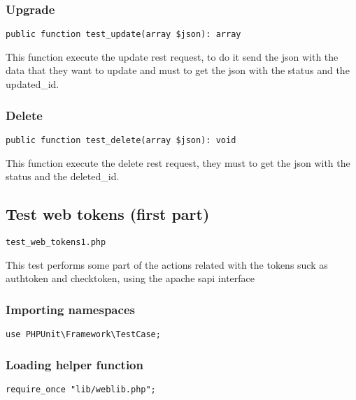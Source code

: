 \documentclass[a4paper]{article}
\begin{document}
\hypertarget{toc75}{}
\subsubsection{Upgrade}

\begin{lstlisting}
public function test_update(array $json): array
\end{lstlisting}

This function execute the update rest request, to do it send the json with
the data that they want to update and must to get the json with the status
and the updated\_id.

\hypertarget{toc76}{}
\subsubsection{Delete}

\begin{lstlisting}
public function test_delete(array $json): void
\end{lstlisting}

This function execute the delete rest request, they must to get the json
with the status and the deleted\_id.

\hypertarget{toc77}{}
\subsection{Test web tokens (first part)}

\begin{lstlisting}
test_web_tokens1.php
\end{lstlisting}

This test performs some part of the actions related with the tokens suck
as authtoken and checktoken, using the apache sapi interface

\hypertarget{toc78}{}
\subsubsection{Importing namespaces}

\begin{lstlisting}
use PHPUnit\Framework\TestCase;
\end{lstlisting}

\hypertarget{toc79}{}
\subsubsection{Loading helper function}

\begin{lstlisting}
require_once "lib/weblib.php";
\end{lstlisting}
\end{document}

